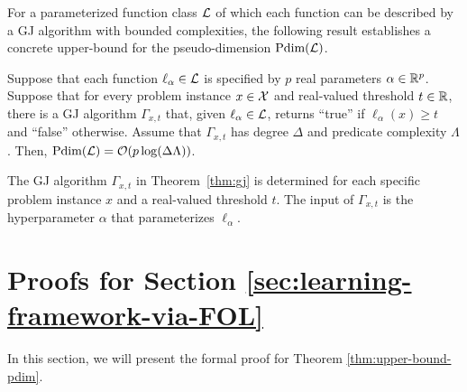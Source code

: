 For a parameterized function class $\mathcal{L}$ of which each function can be described by a GJ algorithm with bounded complexities, the following result establishes a concrete upper-bound for the pseudo-dimension $\text{\normalfont Pdim}(\mathcal{L})$.

\begin{theorem} \label{thm:gj}
    Suppose that each function $\ell_{\alpha} \in \mathcal{L}$ is specified by $p$ real parameters $\alpha \in \mathbb{R}^p$. Suppose that for every problem instance $x \in \mathcal{X}$ and real-valued threshold $t \in \mathbb{R}$, there is a GJ algorithm $\Gamma_{x, t}$ that, given $\ell_{\alpha} \in \mathcal{L}$, returns ``true'' if $\ell_{\alpha}(x) \geq t$ and ``false'' otherwise. Assume that $\Gamma_{x, t}$ has degree $\Delta$ and predicate complexity $\Lambda$. Then, $\text{\normalfont Pdim}(\mathcal{L}) = \mathcal{O}(p\log(\Delta\Lambda))$.
\end{theorem}

The GJ algorithm $\Gamma_{x, t}$ in Theorem~\ref{thm:gj} is determined for each specific problem instance $x$ and a real-valued threshold $t$. The input of $\Gamma_{x, t}$ is the hyperparameter $\alpha$ that parameterizes $\ell_{\alpha}$.


\section{Proofs for Section \ref{sec:learning-framework-via-FOL}} \label{apx:learning-framework-via-FOL}
In this section, we will present the formal proof for Theorem \ref{thm:upper-bound-pdim}. 


